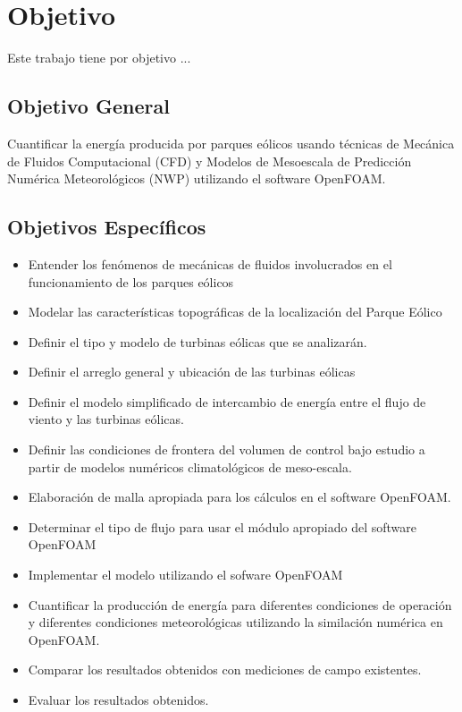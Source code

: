 \section{Objetivo}

Este trabajo tiene por objetivo ...



\subsection{Objetivo General}

Cuantificar la energía producida por parques eólicos usando técnicas de Mecánica de Fluidos Computacional (CFD) y Modelos de Mesoescala de Predicción Numérica  Meteorológicos (NWP) utilizando el software OpenFOAM.

\subsection{Objetivos Específicos}

\begin{itemize}

\item Entender los fenómenos de mecánicas de fluidos involucrados en el funcionamiento de los parques eólicos
\item Modelar las características topográficas de la localización del Parque Eólico
\item Definir el tipo y modelo de turbinas eólicas que se analizarán.
\item Definir el arreglo general y ubicación de las turbinas eólicas
\item Definir el modelo simplificado  de intercambio de energía entre el flujo de viento y las turbinas eólicas. 
\item Definir las condiciones de frontera del volumen de control bajo estudio a partir de modelos numéricos climatológicos de meso-escala.
\item Elaboración de malla apropiada para los cálculos en el software OpenFOAM.
\item Determinar el tipo de flujo para usar el módulo apropiado del software OpenFOAM
\item Implementar el modelo utilizando el sofware OpenFOAM
\item Cuantificar la producción de energía para diferentes condiciones de operación y diferentes condiciones meteorológicas utilizando la similación numérica en OpenFOAM.
\item Comparar los resultados obtenidos con mediciones de campo existentes.
\item Evaluar los resultados obtenidos.
\end{itemize}

